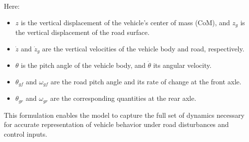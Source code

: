 \documentclass[]{report}
\begin{document}
Here:
\begin{itemize}
	\item $z$ is the vertical displacement of the vehicle’s center of mass (CoM), and $z_g$ is the vertical displacement of the road surface.
	\item $\dot{z}$ and $\dot{z}_g$ are the vertical velocities of the vehicle body and road, respectively.
	\item $\theta$ is the pitch angle of the vehicle body, and $\dot{\theta}$ its angular velocity.
	\item $\theta_{gf}$ and $\omega_{gf}$ are the road pitch angle and its rate of change at the front axle.
	\item $\theta_{gr}$ and $\omega_{gr}$ are the corresponding quantities at the rear axle.
\end{itemize}

This formulation enables the model to capture the full set of dynamics necessary for accurate representation of vehicle behavior under road disturbances and control inputs.
\end{document}
